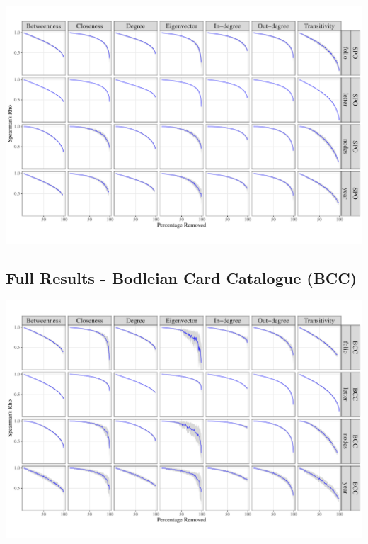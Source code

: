 \documentclass[]{article}
\begin{document}
\includegraphics{network_robustness_article_anon_files/figure-latex/unnamed-chunk-16-1.pdf}

\newpage

\hypertarget{full-results---bodleian-card-catalogue-bcc}{%
\subsection{Full Results - Bodleian Card Catalogue (BCC)}\label{full-results---bodleian-card-catalogue-bcc}}

\includegraphics{network_robustness_article_anon_files/figure-latex/unnamed-chunk-17-1.pdf}
\end{document}
